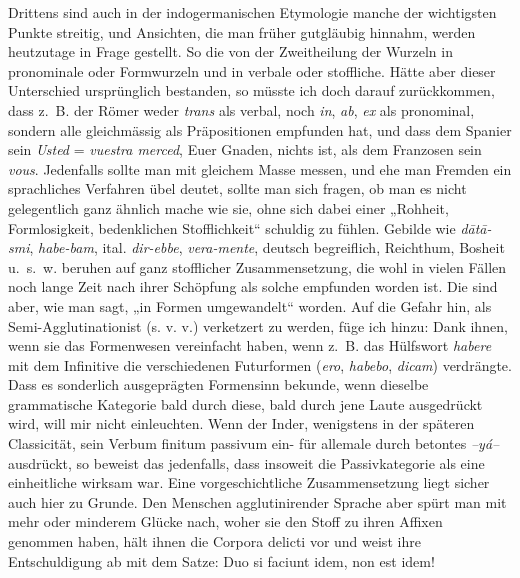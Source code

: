 Drittens sind auch in der indogermanischen Etymologie manche der wichtigsten Punkte streitig, und Ansichten, die man früher gutgläubig hinnahm, werden heutzutage in Frage gestellt. So die von der Zweitheilung der Wurzeln in pronominale oder Formwurzeln und in verbale oder stoffliche. Hätte aber dieser Unterschied ursprünglich be\label{fp.378}standen, so müsste ich doch darauf zurückkommen, dass z.~B. der Römer weder \textit{trans} als verbal, noch \textit{in}, \textit{ab}, \textit{ex} als pronominal, sondern alle gleichmässig als Präpositionen empfunden hat, und dass dem Spanier sein \textit{Usted} = \textit{vuestra merced}, Euer Gnaden, nichts  ist, als dem Franzosen sein \textit{vous}. Jedenfalls sollte man mit gleichem Masse messen, und ehe man  Fremden ein sprachliches Verfahren übel deutet, sollte man sich fragen, ob man es nicht gelegentlich ganz ähnlich mache wie sie, ohne sich dabei einer „Rohheit, Formlosigkeit, bedenklichen Stofflichkeit“ schuldig zu fühlen. Gebilde wie \textit{dātā-smi}, \textit{habe-bam}, ital. \textit{dir-ebbe}, \textit{vera-mente}, deutsch begreiflich, Reichthum, Bosheit u.~s.~w. beruhen auf ganz stofflicher Zusammensetzung, die wohl in vielen Fällen noch lange Zeit nach ihrer Schöpfung als solche empfunden worden ist. Die sind aber, wie man sagt, „in  Formen umgewandelt“ worden. Auf die Gefahr hin, als Semi-Agglutinationist (s. v. v.) verketzert zu werden, füge ich hinzu: Dank ihnen, wenn sie das Formenwesen vereinfacht haben, wenn z.~B. das Hülfswort \textit{habere} mit dem Infinitive die verschiedenen Futurformen (\textit{ero}, \textit{habebo}, \textit{dicam}) verdrängte. Dass es sonderlich ausgeprägten Formensinn bekunde, \label{sp.397} wenn dieselbe grammatische Kategorie bald durch diese, bald durch jene Laute ausgedrückt wird, will mir nicht einleuchten. Wenn der Inder, wenigstens in der späteren Classicität, sein Verbum finitum passivum ein- für allemale durch betontes \textit{–yá–} ausdrückt, so beweist das jedenfalls, dass insoweit die Passivkategorie als eine einheitliche wirksam war. Eine vorgeschichtliche Zusammensetzung liegt sicher auch hier zu Grunde. Den Menschen agglutinirender Sprache aber spürt man mit mehr oder minderem Glücke nach, woher sie den Stoff zu ihren Affixen genommen haben, hält ihnen die Corpora delicti vor und weist ihre Entschuldigung ab mit dem Satze: Duo si faciunt idem, non est idem!

